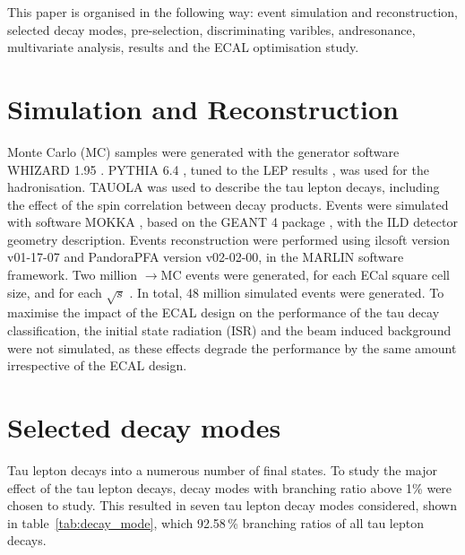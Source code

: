 \documentclass[a4paper,11pt]{article}
\newcommand{\decayRhoShort}{\PGrP{\PGpm\PGpz}}
\newcommand{\decayAiPhotonShort}{\PaDoP{\PGpm\PGpz\PGpz}}
\newcommand{\eeToTauTau}{\Pep\Pem$\to$\PGtp\PGtm}
\newcommand{\rootS}{\ensuremath{\sqrt{s}} }
\begin{document}
This paper is organised in the following way: event simulation and reconstruction, selected decay modes, pre-selection, discriminating varibles, \decayRhoShort and\decayAiPhotonShort resonance, multivariate analysis, results and the ECAL optimisation study.

\section{Simulation and Reconstruction}
\label{section:MC}


Monte Carlo (MC) samples were generated with the generator software WHIZARD 1.95 \cite{whizard}.  PYTHIA 6.4 \cite{Sjostrand:1995iq},  tuned to the LEP results \cite{}, was used for the hadronisation. TAUOLA \cite{Jadach:1993hs} was used to describe the tau lepton decays, including the effect of the spin correlation between decay products. Events were simulated with software MOKKA \cite{MoradeFreitas:2002kj}, based on the GEANT 4 package  \cite{Agostinelli:2002hh}, with the ILD detector geometry description. Events reconstruction were performed using ilcsoft version v01-17-07 and PandoraPFA version v02-02-00, in the MARLIN software framework\cite{Gaede:2006pj}. Two million \eeToTauTau MC events were generated, for each ECal square cell size, and for each \rootS. In total, 48 million simulated events were generated. To maximise the impact of the ECAL design on the performance of the tau decay classification, the initial state radiation (ISR) and the beam induced background were not simulated, as these effects degrade the performance by the same amount irrespective of the ECAL design. 


\section{Selected decay modes}

Tau lepton decays into a numerous number of final states. To study the major effect of the tau lepton decays, decay modes with branching ratio above 1\% were chosen to study. This resulted in seven tau lepton decay modes considered, shown in table~\ref{tab:decay_mode}, which 92.58\,\% branching ratios of all tau lepton decays. 
\end{document}

